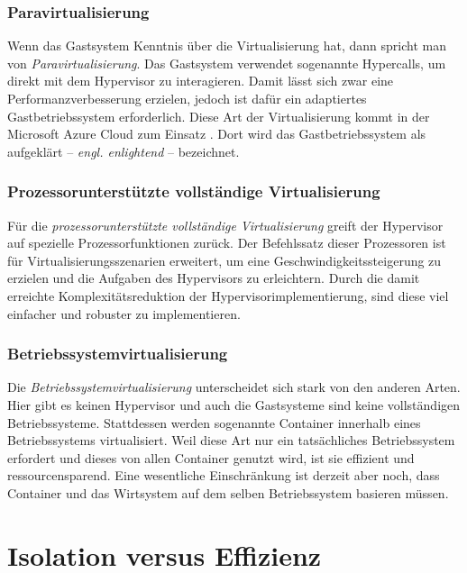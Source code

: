 \subsubsection{Paravirtualisierung}

Wenn das Gastsystem Kenntnis über die Virtualisierung hat, dann spricht man von \textit{Paravirtualisierung}. Das Gastsystem verwendet sogenannte Hypercalls, um direkt mit dem Hypervisor zu interagieren. Damit lässt sich zwar eine Performanzverbesserung erzielen, jedoch ist dafür ein adaptiertes Gastbetriebssystem erforderlich. Diese Art der Virtualisierung kommt \zB in der Microsoft Azure Cloud zum Einsatz \cite[30]{Krishnan10}. Dort wird das Gastbetriebssystem als aufgeklärt -- \textit{engl. enlightend} -- bezeichnet.

\subsubsection{Prozessorunterstützte vollständige Virtualisierung}

Für die \textit{prozessorunterstützte vollständige Virtualisierung} greift der Hypervisor auf spezielle Prozessorfunktionen zurück. Der Befehlssatz dieser Prozessoren ist für Virtualisierungsszenarien erweitert, um eine Geschwindigkeitssteigerung zu erzielen und die Aufgaben des Hypervisors zu erleichtern. Durch die damit erreichte Komplexitätsreduktion der Hypervisorimplementierung, sind diese viel einfacher und robuster zu implementieren.

\subsubsection{Betriebssystemvirtualisierung}

Die \textit{Betriebssystemvirtualisierung} unterscheidet sich stark von den anderen Arten. Hier gibt es keinen Hypervisor und auch die Gastsysteme sind keine vollständigen Betriebssysteme. Stattdessen werden sogenannte Container innerhalb eines Betriebssystems virtualisiert. Weil diese Art nur ein tatsächliches Betriebssystem erfordert und dieses von allen Container genutzt wird, ist sie effizient und ressourcensparend. Eine wesentliche Einschränkung ist derzeit aber noch, dass Container und das Wirtsystem auf dem selben Betriebssystem basieren müssen.

\section{Isolation versus Effizienz}
\label{sec:isolation-vs-efficiencys}

